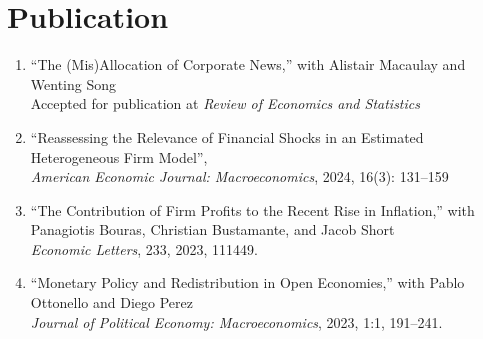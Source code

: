 \documentclass[11pt]{article}
\begin{document}
%
%
%






\section{Publication}
\begin{enumerate}[leftmargin=*,labelindent=0em,labelsep=0em,itemindent=-10pt]
	\item ``The (Mis)Allocation of Corporate News,'' with Alistair Macaulay and Wenting Song\\[0.5em]
	Accepted for publication at \textit{Review of Economics and Statistics} 
	\item ``Reassessing the Relevance of Financial Shocks in an Estimated Heterogeneous Firm Model'',\\[0.5em] 
	\textit{American Economic Journal: Macroeconomics}, 2024, 16(3): 131–159
	\item ``The Contribution of Firm Profits to the Recent Rise in Inflation,'' with Panagiotis Bouras, Christian Bustamante, and Jacob Short\\[0.5em]
	\textit{Economic Letters}, 233, 2023, 111449.
	\item ``Monetary Policy and Redistribution in Open Economies,'' with Pablo Ottonello and Diego Perez\\[0.5em]
	\textit{Journal of Political Economy: Macroeconomics}, 2023, 1:1, 191–241.
\end{enumerate}
\end{document}
